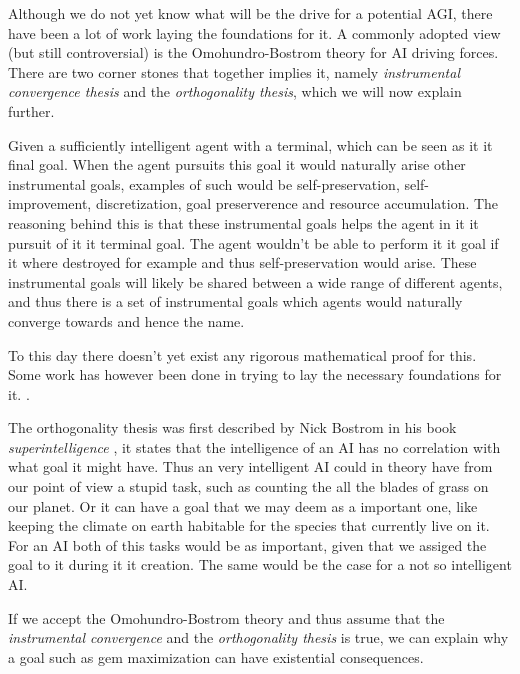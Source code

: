 \documentclass[12pt,A4]{report}
\theoremstyle{definition}
\begin{document}
Although we do not yet know what will be the drive for a potential AGI, there have been a lot of work laying the foundations for it. A commonly adopted view (but still controversial) is the Omohundro-Bostrom theory for AI driving forces. There are two corner stones that together implies it, namely \textit{instrumental convergence thesis} and the \textit{orthogonality thesis}, which we will now explain further.

Given a sufficiently intelligent agent with a terminal, which can be seen as it it final goal. When the agent pursuits this goal it would naturally arise other instrumental goals, examples of such would be self-preservation, self-improvement, discretization, goal preserverence and resource accumulation. The reasoning behind this is that these instrumental goals helps the agent in it it pursuit of it it terminal goal. The agent wouldn't be able to perform it it goal if it where destroyed for example and thus self-preservation would arise. These instrumental goals will likely be shared between a wide range of different agents, and thus there is a set of instrumental goals which agents would naturally converge towards and hence the name. 

To this day there doesn't yet exist any rigorous mathematical proof for this. Some work has however been done in trying to lay the necessary foundations for it. \autocite{TURNER et al}.  

The orthogonality thesis was first described by Nick Bostrom in his book \textit{superintelligence} \cite{Bostrom}, it states that the intelligence of an AI has no correlation with what goal it might have. Thus an very intelligent AI could in theory have from our point of view a stupid task, such as counting the all the blades of grass on our planet. Or it can have a goal that we may deem as a important one, like keeping the climate on earth habitable for the species that currently live on it. For an AI both of this tasks would be as important, given that we assiged the goal to it during it it creation. The same would be the case for a not so intelligent AI.

If we accept the Omohundro-Bostrom theory and thus assume that the \textit{instrumental convergence} and the \textit{orthogonality thesis} is true, we can explain why a goal such as gem maximization can have existential consequences. 

\end{document}
